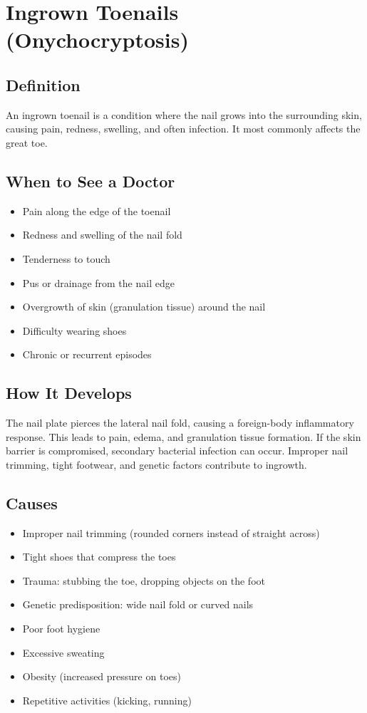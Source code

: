 \chapter{Ingrown Toenails (Onychocryptosis)}

\section*{Definition}
An ingrown toenail is a condition where the nail grows into the surrounding skin, causing pain, redness, swelling, and often infection. It most commonly affects the great toe.

\section*{When to See a Doctor}
\begin{itemize}
\item Pain along the edge of the toenail
\item Redness and swelling of the nail fold
\item Tenderness to touch
\item Pus or drainage from the nail edge
\item Overgrowth of skin (granulation tissue) around the nail
\item Difficulty wearing shoes
\item Chronic or recurrent episodes
\end{itemize}

\section*{How It Develops}
The nail plate pierces the lateral nail fold, causing a foreign-body inflammatory response. This leads to pain, edema, and granulation tissue formation. If the skin barrier is compromised, secondary bacterial infection can occur. Improper nail trimming, tight footwear, and genetic factors contribute to ingrowth.

\section*{Causes}
\begin{itemize}
\item Improper nail trimming (rounded corners instead of straight across)
\item Tight shoes that compress the toes
\item Trauma: stubbing the toe, dropping objects on the foot
\item Genetic predisposition: wide nail fold or curved nails
\item Poor foot hygiene
\item Excessive sweating
\item Obesity (increased pressure on toes)
\item Repetitive activities (kicking, running)
\end{itemize}

